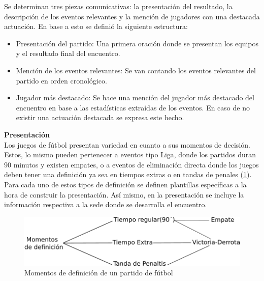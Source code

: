 
    Se determinan tres piezas comunicativas: la presentación del resultado, la descripción de los eventos relevantes y 
la mención de jugadores con una destacada actuación. En base a esto se definió la siguiente estructura:

\begin{itemize}
    \item Presentación del partido: Una primera oración donde se presentan los equipos y el resultado final del encuentro.
    \item Mención de los eventos relevantes: Se van contando los eventos relevantes del partido en orden cronol\'ogico.
    \item Jugador más destacado: Se hace una mención del jugador más destacado del encuentro en base a las estadísticas extraídas de los 
    eventos. En caso de no existir una actuación destacada se expresa este hecho.
\end{itemize}


    \textbf{Presentación}\\

    Los juegos de fútbol presentan variedad en cuanto a sus momentos de decisión. Estos, lo mismo pueden pertenecer a eventos tipo Liga, donde los partidos 
duran 90 minutos y existen empates, o a eventos de eliminación directa donde los juegos deben tener una definición ya sea en tiempos extras 
o en tandas de penales (\ref{fig_momentos_definicion}). Para cada uno de estos tipos de 
definición se definen plantillas específicas a la hora de construir la presentación. Así mismo, en la presentación se incluye la información 
respectiva a la sede donde se desarrolla el encuentro.\\

    \begin{figure}[!]
        \begin{center}
            \includegraphics[scale=1]{Graphics/momentodef.png}
        \end{center}
        \caption{Momentos de definición de un partido de fútbol}
        \label{fig_momentos_definicion}
    \end{figure}

